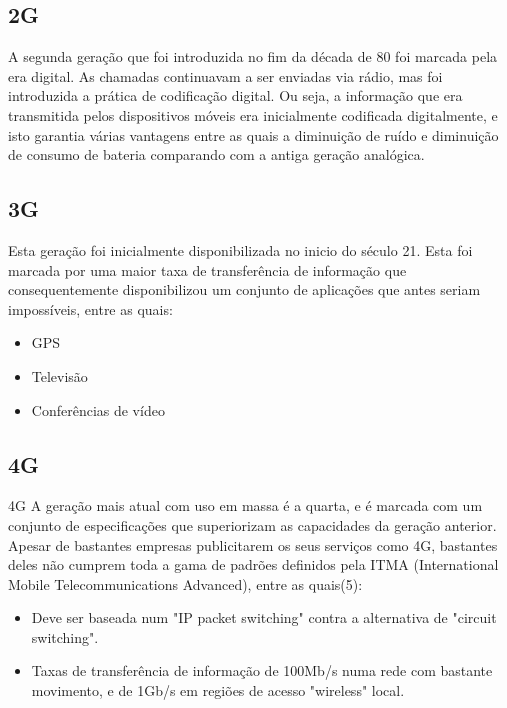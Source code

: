 \documentclass{llncs}
\begin{document}
\subsection{2G}
\hspace*{1.5em}A segunda geração que foi introduzida no fim da década de 80 \cite{Ton:Pan:Kus} foi marcada pela era digital. As chamadas continuavam a ser enviadas via rádio, mas foi introduzida a prática de codificação digital. Ou seja, a informação que era transmitida pelos dispositivos móveis era inicialmente codificada digitalmente, e isto garantia várias vantagens entre as quais a diminuição de ruído e diminuição de consumo de bateria comparando com a antiga geração analógica.
\subsection{3G}
\hspace*{1.5em}Esta geração foi inicialmente disponibilizada no inicio do século 21. Esta foi marcada por uma maior taxa de transferência de informação que consequentemente disponibilizou um conjunto de aplicações que antes seriam impossíveis, entre as quais:
\begin{itemize}
    \item GPS
    \item Televisão
    \item Conferências de vídeo
\end{itemize}
\subsection{4G}
4G
\hspace*{1.5em}A geração mais atual com uso em massa é a quarta, e é marcada com um conjunto de especificações que superiorizam as capacidades da geração anterior. Apesar de bastantes empresas publicitarem os seus serviços como 4G, bastantes deles não cumprem toda a gama de padrões definidos pela ITMA (International Mobile Telecommunications Advanced), entre as quais(5):
\begin{itemize}
    \item Deve ser baseada num "IP packet switching" contra a alternativa de "circuit switching".
    \item Taxas de transferência de informação de 100Mb/s numa rede com bastante movimento, e de 1Gb/s em regiões de acesso "wireless" local.
\end{itemize}
\end{document}
